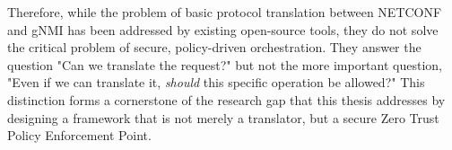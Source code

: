 \documentclass[12pt, a4paper, reqno, oneside]{book}
\begin{document}
Therefore, while the problem of basic protocol translation between NETCONF and gNMI has been addressed by existing open-source tools, they do not solve the critical problem of secure, policy-driven orchestration. They answer the question "Can we translate the request?" but not the more important question, "Even if we can translate it, \textit{should} this specific operation be allowed?" This distinction forms a cornerstone of the research gap that this thesis addresses by designing a framework that is not merely a translator, but a secure Zero Trust Policy Enforcement Point.




\end{document}
